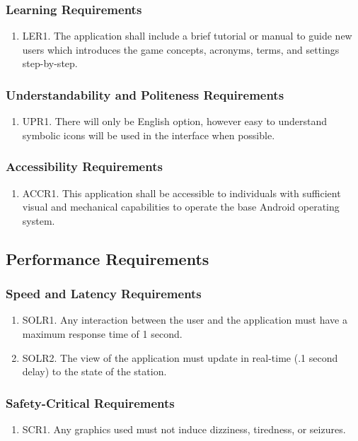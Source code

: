 \documentclass[]{article}
\begin{document}
\subsubsection{Learning Requirements}
\begin{enumerate}
	\item LER1. The application shall include a brief tutorial or manual to guide new users which introduces the game concepts, acronyms, terms, and settings step-by-step.
\end{enumerate}

\subsubsection{Understandability and Politeness Requirements}
\begin{enumerate}
	\item UPR1. There will only be English option, however easy to understand symbolic icons will be used in the interface when possible.
\end{enumerate}

\subsubsection{Accessibility Requirements}
\begin{enumerate}
	\item ACCR1. This application shall be accessible to individuals with sufficient visual and mechanical capabilities to operate the base Android operating system.
\end{enumerate}

\subsection{Performance Requirements}
\subsubsection{Speed and Latency Requirements}
\begin{enumerate}
	\item SOLR1. Any interaction between the user and the application must have a maximum response time of 1 second.
	\item SOLR2. The view of the application must update in real-time (.1 second delay) to the state of the station.
\end{enumerate}

\subsubsection{Safety-Critical Requirements}
\begin{enumerate}
	\item SCR1. Any graphics used must not induce dizziness, tiredness, or seizures.
\end{enumerate}
\end{document}
